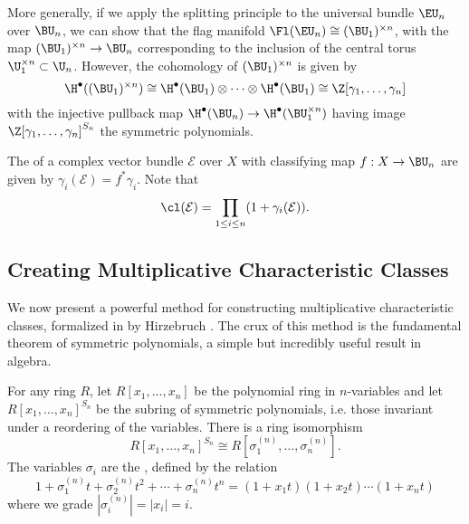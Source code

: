 More generally, if we apply the splitting principle to the universal bundle $\EU_n$ over $\BU_n$, we can show that the flag manifold $\Fl(\EU_n)\cong (\BU_1)^{\times n}$, with the map $(\BU_1)^{\times n} \to \BU_n$ corresponding to the inclusion of the central torus $\U_1^{\times n}\subset \U_n$. However, the cohomology of $(\BU_1)^{\times n}$ is given by
\[
	\H^\bullet((\BU_1)^{\times n}) \cong \H^\bullet(\BU_1)\otimes\cdots\otimes \H^\bullet(\BU_1) \cong \Z[\gamma_1,\ldots,\gamma_n]
\]
with the injective pullback map $\H^\bullet(\BU_n) \to \H^\bullet(\BU_1^{\times n})$ having image $\Z[\gamma_1,\ldots, \gamma_n]^{S_n}$ the symmetric polynomials.


\begin{definition}\label{def:chern-roots}
	The  of a complex vector bundle $\mathcal{E}$ over $X$ with classifying map $f : X \to \BU_n$ are given by $\gamma_i(\mathcal{E}) = f^*\gamma_i$. Note that
	\[ \cl(\mathcal{E}) = \prod_{1\leq i \leq n} (1+\gamma_i(\mathcal{E})). \]
\end{definition}

\subsection{Creating Multiplicative Characteristic Classes}

We now present a powerful method for constructing multiplicative characteristic classes, formalized in by Hirzebruch \cite{hirzebruch1966methods}.
The crux of this method is the fundamental theorem of symmetric polynomials, a simple but incredibly useful result in algebra.

\begin{theorem}
	For any ring $R$, let $R[x_1,\ldots, x_n]$ be the polynomial ring in $n$-variables and let $R[x_1,\ldots, x_n]^{S_n}$ be the subring of symmetric polynomials, i.e. those invariant under a reordering of the variables. There is a ring isomorphism
	\begin{equation}\label{eq:symmetric-polynomial-isomorphism}
		R[x_1,\ldots, x_n]^{S_n} \cong R[\sigma_1^{(n)},\ldots, \sigma_n^{(n)}].
	\end{equation}
	The variables $\sigma_i$ are the , defined by the relation
	\begin{equation}\label{eq:symmetric-polynomials}
		1+\sigma_1^{(n)}t+\sigma_2^{(n)}t^2+\cdots+\sigma_n^{(n)}t^n = (1+x_1t)(1+x_2t)\cdots (1+x_nt)
	\end{equation}
	where we grade $|\sigma_i^{(n)}|=|x_i|=i$.
\end{theorem}

